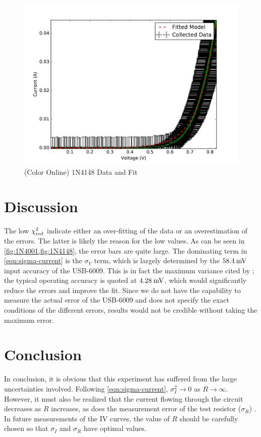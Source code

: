 \documentclass[reprint]{revtex4-1}
\begin{document}
\begin{figure}
\includegraphics[width=\columnwidth]{../resources/plots/diode2_1n4148.pdf}
\caption{(Color Online) \textsc{1N4148} Data and Fit}
\label{fig:1N4148}
\end{figure}

\section{Discussion}

The low $\chi^2_{\rm{red}}$ indicate either an over-fitting of the data or an overestimation of the errors. The latter is likely the reason for the low values. As can be seen in \cref{fig:1N4001,fig:1N4148}, the error bars are quite large. The dominating term in \cref{eqn:sigma-current} is the $\sigma_V$ term, which is largely determined by the $58.4\:\rm{mV}$ input accuracy of the USB-6009. This is in fact the maximum variance cited by \cite{Instruments2014}; the typical operating accuracy is quoted at $4.28\:\rm{mV}$, which would significantly reduce the errors and improve the fit. Since we do not have the capability to measure the actual error of the USB-6009 and \cite{Instruments2014} does not specify the exact conditions of the different errors, results would not be credible without taking the maximum error.

\section{Conclusion}

In conclusion, it is obvious that this experiment has suffered from the large uncertainties involved. Following \cref{eqn:sigma-current}, $\sigma_I^2 \to 0$ as $R \to \infty$. However, it must also be realized that the current flowing through the circuit decreases as $R$ increases, as does the measurement error of the test resistor ($\sigma_R$) \cite{Keithley2003}. In future measurements of the IV curves, the value of $R$ should be carefully chosen so that $\sigma_I$ and $\sigma_R$ have optimal values.
\end{document}
